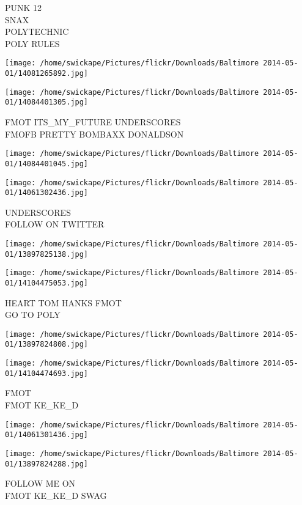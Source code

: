 \documentclass[10pt,letterpaper]{article}
\begin{document}
PUNK 12\\
SNAX\\
POLYTECHNIC\\
POLY RULES
\pagebreak

\texttt{[image: /home/swickape/Pictures/flickr/Downloads/Baltimore 2014-05-01/14081265892.jpg]}

\vspace{0.25in}
\texttt{[image: /home/swickape/Pictures/flickr/Downloads/Baltimore 2014-05-01/14084401305.jpg]}

FMOT ITS\_MY\_FUTURE UNDERSCORES\\
FMOFB PRETTY BOMBAXX DONALDSON
\pagebreak

\texttt{[image: /home/swickape/Pictures/flickr/Downloads/Baltimore 2014-05-01/14084401045.jpg]}

\vspace{0.25in}
\texttt{[image: /home/swickape/Pictures/flickr/Downloads/Baltimore 2014-05-01/14061302436.jpg]}

UNDERSCORES\\
FOLLOW ON TWITTER
\pagebreak

\texttt{[image: /home/swickape/Pictures/flickr/Downloads/Baltimore 2014-05-01/13897825138.jpg]}

\vspace{0.25in}
\texttt{[image: /home/swickape/Pictures/flickr/Downloads/Baltimore 2014-05-01/14104475053.jpg]}

HEART TOM HANKS FMOT\\
GO TO POLY
\pagebreak

\texttt{[image: /home/swickape/Pictures/flickr/Downloads/Baltimore 2014-05-01/13897824808.jpg]}

\vspace{0.25in}
\texttt{[image: /home/swickape/Pictures/flickr/Downloads/Baltimore 2014-05-01/14104474693.jpg]}

FMOT\\
FMOT KE\_KE\_D
\pagebreak

\texttt{[image: /home/swickape/Pictures/flickr/Downloads/Baltimore 2014-05-01/14061301436.jpg]}

\vspace{0.25in}
\texttt{[image: /home/swickape/Pictures/flickr/Downloads/Baltimore 2014-05-01/13897824288.jpg]}

FOLLOW ME ON\\
FMOT KE\_KE\_D SWAG
\pagebreak
\end{document}

